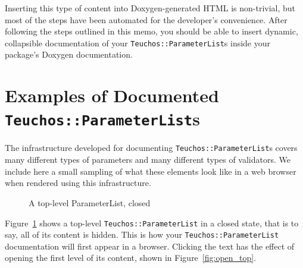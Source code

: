 \documentclass[pdf,ps2pdf,12pt]{smemo}
\begin{document}
\begin{memo}

Inserting this type of content into Doxygen-generated HTML is
non-trivial, but most of the steps have been automated for the
developer's convenience.  After following the steps outlined in this
memo, you should be able to insert dynamic, collapsible documentation
of your \texttt{Teuchos::ParameterList}s inside your package's Doxygen
documentation.

\section{Examples of Documented \texttt{Teuchos::ParameterList}s}
\label{sec:examples}

The infrastructure developed for documenting
\texttt{Teuchos::ParameterList}s covers many different types of
parameters and many different types of validators.  We include here a
small sampling of what these elements look like in a web browser when
rendered using this infrastructure.

\begin{figure}[h]
  \begin{centering}
    \caption{\label{fig:closed_top} A top-level ParameterList, closed}
  \end{centering}
\end{figure}

Figure~\ref{fig:closed_top} shows a top-level
\texttt{Teuchos::ParameterList} in a closed state, that is to say, all
of its content is hidden.  This is how your
\texttt{Teuchos::ParameterList} documentation will first appear in a
browser.  Clicking the text has the effect of opening the first level
of its content, shown in Figure~\ref{fig:open_top}.


\end{memo}
\end{document}
